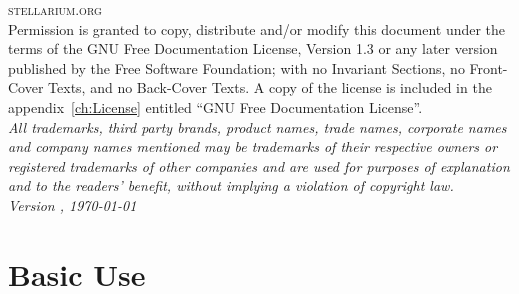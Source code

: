 \documentclass[12pt,fleqn,dvipdfmx]{book} %
\newcommand{\DocumentEdition}{1}
\begin{document}
\noindent \textsc{stellarium.org}\\ %

\noindent Permission is granted to copy, distribute and/or modify 
this document under the terms of the GNU Free Documentation License, 
Version 1.3 or any later version published by the Free Software 
Foundation; with no Invariant Sections, no Front-Cover Texts, 
and no Back-Cover Texts. A copy of the license is included in 
the appendix~\ref{ch:License} entitled ``GNU Free Documentation
License''.\\ %

\small{\noindent \textit{All trademarks, third party brands, product names, trade names,
corporate names and company names mentioned may be trademarks of their
respective owners or registered trademarks of other companies and are
used for purposes of explanation and to the readers' benefit, without
implying a violation of copyright law.}}\\


\noindent \textit{Version \StelVersion-\DocumentEdition, \today} %



\pagestyle{empty} %
\ifpdf
 \tableofcontents %
\fi
\cleardoublepage %

\pagestyle{fancy} %



\part{Basic Use}

\end{document}

